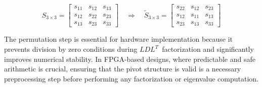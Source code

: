 \documentclass[11pt,a4paper]{article}
\begin{document}
\[
S_{3\times3} =
\begin{bmatrix}
s_{11} & s_{12} & s_{13} \\
s_{12} & s_{22} & s_{23} \\
s_{13} & s_{23} & s_{33}
\end{bmatrix}
\quad\Longrightarrow\quad
\tilde{S}_{3\times3} =
\begin{bmatrix}
s_{22} & s_{12} & s_{23} \\
s_{12} & s_{11} & s_{13} \\
s_{23} & s_{13} & s_{33}
\end{bmatrix}
\]

The permutation step is essential for hardware implementation because it prevents division by zero conditions during $LDL^{T}\,$ factorization and significantly improves numerical stability. In FPGA-based designs, where predictable and safe arithmetic is crucial, ensuring that the pivot structure is valid is a necessary preprocessing step before performing any factorization or eigenvalue computation.
\end{document}
